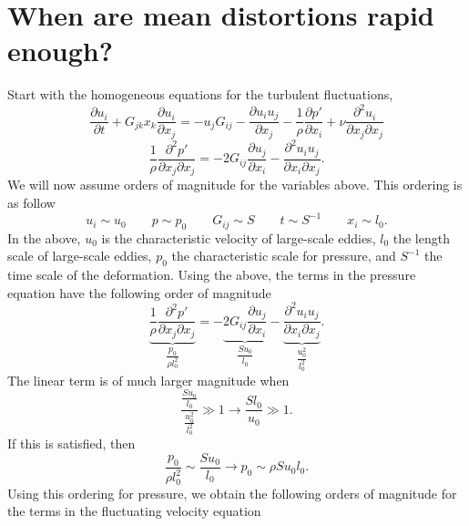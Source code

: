 \documentclass[oneside,a4paper,11pt]{report}
\newcommand{\pfluc}{p'}
\newcommand{\uifluc}{u_i}
\newcommand{\ujfluc}{u_j}
\begin{document}
\section{When are mean distortions rapid enough?}
Start with the homogeneous equations for the turbulent fluctuations,
\begin{equation}
\frac{\partial \uifluc}{\partial t} + G_{jk} x_k \frac{\partial \uifluc}{\partial x_j} = -\ujfluc G_{ij} - \frac{\partial \uifluc \ujfluc}{\partial x_j} - \frac{1}{\rho} \frac{\partial \pfluc}{\partial x_i} + \nu \frac{\partial^2 \uifluc}{\partial x_j \partial x_j} 
\end{equation}
\begin{equation}
\frac{1}{\rho} \frac{\partial^2 \pfluc}{\partial x_j \partial x_j} = -2 G_{ij} \frac{\partial \ujfluc}{\partial x_i} - \frac{\partial^2 \uifluc \ujfluc}{\partial x_i \partial x_j}.
\end{equation}
We will now assume orders of magnitude for the variables above. This ordering is as follow
\begin{equation}
    u_i \sim u_0 \qquad p \sim p_0 \qquad G_{ij} \sim S \qquad t \sim S^{-1} \qquad x_i \sim l_0.  
\end{equation}
In the above, $u_0$ is the characteristic velocity of large-scale eddies, $l_0$ the length scale of large-scale eddies, $p_0$ the characteristic scale for pressure, and $S^{-1}$ the time scale of the deformation. Using the above, the terms in the pressure equation have the following order of magnitude
\begin{equation}
\underbrace{\frac{1}{\rho} \frac{\partial^2 \pfluc}{\partial x_j \partial x_j}}_{\dfrac{p_0}{\rho l_0^2}} = -\underbrace{2 G_{ij} \frac{\partial \ujfluc}{\partial x_i}}_{\dfrac{S u_0}{l_0}} - \underbrace{\frac{\partial^2 \uifluc \ujfluc}{\partial x_i \partial x_j}}_{\dfrac{u_0^2}{l_0^2}}.
\end{equation}
The linear term is of much larger magnitude when
\begin{equation}
\frac{\frac{Su_0}{l_0}}{\frac{u_0^2}{l_0^2}} \gg 1 \to \frac{S l_0}{u_0} \gg 1.
\end{equation}
If this is satisfied, then 
\begin{equation}
\frac{p_0}{\rho l_0^2} \sim \frac{S u_0}{l_0} \to p_0 \sim \rho S u_0 l_0.
\end{equation}
Using this ordering for pressure, we obtain the following orders of magnitude for the terms in the fluctuating velocity equation
\end{document}
